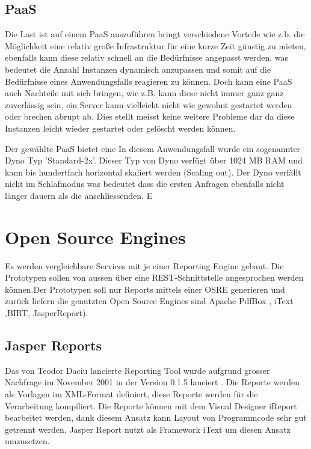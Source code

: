 \documentclass[main.tex]{subfiles}
\begin{document}
\subsection{PaaS}

Die Last ist auf einem PaaS auszuführen bringt verschiedene Vorteile wie z.b. die Möglichkeit eine relativ große Infrastruktur für eine kurze Zeit günstig zu mieten, ebenfalls kann diese relativ schnell an die Bedürfnisse angepasst werden, was bedeutet die Anzahl Instanzen dynamisch anzupassen und somit auf die Bedürfnisse eines Anwendungsfalls reagieren zu können.
Doch kann eine PaaS auch Nachteile mit sich bringen, wie z.B. kann diese nicht immer ganz ganz  zuverlässig sein, ein Server kann vielleicht nicht wie gewohnt gestartet werden oder brechen abrupt ab. Dies stellt meisst keine weitere Probleme dar da diese Instanzen leicht wieder gestartet oder gelöscht werden können. \cite[Kap.~3]{molyneaux2014art} 


Der gewählte PaaS bietet eine 
In diesem Anwendungsfall wurde ein sogenannter Dyno Typ 'Standard-2x'. Dieser Typ von Dyno verfügt über 1024 MB RAM und kann bis hundertfach horizontal skaliert werden (Scaling out). Der Dyno verfällt nicht im Schlafmodus was bedeutet dass die ersten Anfragen ebenfalls nicht länger dauern als die anschliessenden.
E


\section{Open Source Engines }




Es werden vergleichbare Services mit je einer Reporting Engine gebaut. Die Prototypen sollen von aussen über eine REST-Schnittstelle\cite{richardson_ruby_2007} angesprochen werden können.Der Prototypen soll nur Reports mittels einer OSRE generieren und zurück liefern die genutzten Open Source Engines sind Apache PdfBox , iText ,BIRT, JasperReport).




\subsection{Jasper Reports\textregistered}
Das von Teodor Daciu lancierte Reporting Tool wurde aufgrund grosser Nachfrage im November 2001 in der Version 0.1.5 lanciert \cite[Kapitel~1]{heffelfinger_2009}. Die Reporte werden als Vorlagen im XML-Format definiert, diese Reporte werden für die Verarbeitung kompiliert. Die Reporte können mit dem Visual Designer iReport bearbeitet werden, dank diesem Ansatz kann Layout von Programmcode sehr gut getrennt werden. Jasper Report nutzt als Framework iText um diesen Ansatz umzusetzen. 
\end{document}

